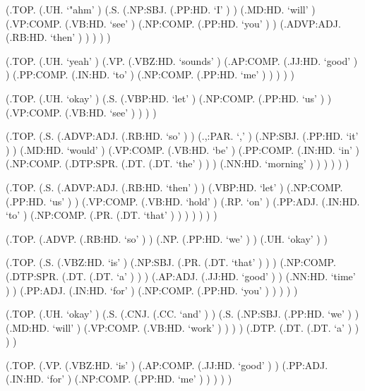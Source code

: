\documentclass[10pt]{article}
\begin{document}
\begin{parsetree}  (.TOP. (.UH. `"ahm' ) (.S. (.NP:SBJ. (.PP:HD. `I' ) ) (.MD:HD. `will' ) (.VP:COMP. (.VB:HD. `see' ) (.NP:COMP. (.PP:HD. `you' ) ) (.ADVP:ADJ. (.RB:HD. `then' ) ) ) ) ) \end{parsetree}

\begin{parsetree}  (.TOP. (.UH. `yeah' ) (.VP. (.VBZ:HD. `sounds' ) (.AP:COMP. (.JJ:HD. `good' ) ) (.PP:COMP. (.IN:HD. `to' ) (.NP:COMP. (.PP:HD. `me' ) ) ) ) ) \end{parsetree}

\begin{parsetree}  (.TOP. (.UH. `okay' ) (.S. (.VBP:HD. `let' ) (.NP:COMP. (.PP:HD. `us' ) ) (.VP:COMP. (.VB:HD. `see' ) ) ) ) \end{parsetree}

\begin{parsetree}  (.TOP. (.S. (.ADVP:ADJ. (.RB:HD. `so' ) ) (.,:PAR. `,' ) (.NP:SBJ. (.PP:HD. `it' ) ) (.MD:HD. `would' ) (.VP:COMP. (.VB:HD. `be' ) (.PP:COMP. (.IN:HD. `in' ) (.NP:COMP. (.DTP:SPR. (.DT. (.DT. `the' ) ) ) (.NN:HD. `morning' ) ) ) ) ) ) \end{parsetree}

\begin{parsetree}  (.TOP. (.S. (.ADVP:ADJ. (.RB:HD. `then' ) ) (.VBP:HD. `let' ) (.NP:COMP. (.PP:HD. `us' ) ) (.VP:COMP. (.VB:HD. `hold' ) (.RP. `on' ) (.PP:ADJ. (.IN:HD. `to' ) (.NP:COMP. (.PR. (.DT. `that' ) ) ) ) ) ) ) \end{parsetree}

\begin{parsetree}  (.TOP. (.ADVP. (.RB:HD. `so' ) ) (.NP. (.PP:HD. `we' ) ) (.UH. `okay' ) ) \end{parsetree}

\begin{parsetree}  (.TOP. (.S. (.VBZ:HD. `is' ) (.NP:SBJ. (.PR. (.DT. `that' ) ) ) (.NP:COMP. (.DTP:SPR. (.DT. (.DT. `a' ) ) ) (.AP:ADJ. (.JJ:HD. `good' ) ) (.NN:HD. `time' ) ) (.PP:ADJ. (.IN:HD. `for' ) (.NP:COMP. (.PP:HD. `you' ) ) ) ) ) \end{parsetree}

\begin{parsetree}  (.TOP. (.UH. `okay' ) (.S. (.CNJ. (.CC. `and' ) ) (.S. (.NP:SBJ. (.PP:HD. `we' ) ) (.MD:HD. `will' ) (.VP:COMP. (.VB:HD. `work' ) ) ) ) (.DTP. (.DT. (.DT. `a' ) ) ) ) \end{parsetree}

\begin{parsetree}  (.TOP. (.VP. (.VBZ:HD. `is' ) (.AP:COMP. (.JJ:HD. `good' ) ) (.PP:ADJ. (.IN:HD. `for' ) (.NP:COMP. (.PP:HD. `me' ) ) ) ) ) \end{parsetree}
\end{document}
